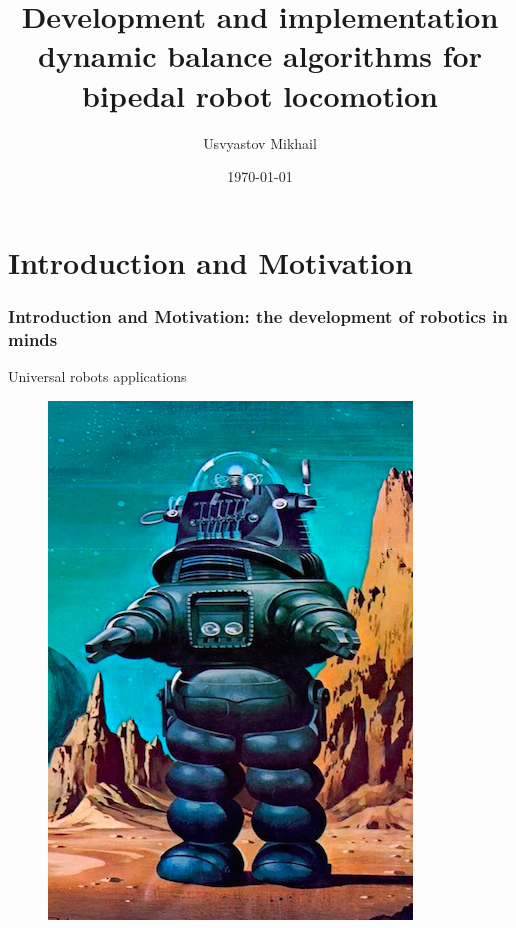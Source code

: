 \documentclass{beamer}
\title[\hbox to 56mm{Bipedal robot locomotion control\hfill\insertframenumber\,/\,\inserttotalframenumber}]
            {Development and implementation dynamic balance algorithms for bipedal robot locomotion}
\author{Usvyastov Mikhail}
\institute[Innopolis]{Innopolis University\\
    Final presentation\\
    Supervisor: Evgeni Magid
}
\date{\normalsize \today}
\begin{document}
	\begin{frame}
	  \titlepage
	\end{frame}

	\section*{Introduction and Motivation}
	\begin{frame}
		\frametitle{Introduction and Motivation: the development of robotics in minds}
		\centering
		Universal robots applications
		
		\begin{figure}[h!]
			\begin{minipage}[H]{0.20\linewidth}
				\includegraphics[width=\linewidth]{presentation_images/1}

\end{minipage}
\end{figure}
\end{frame}
\end{document}
